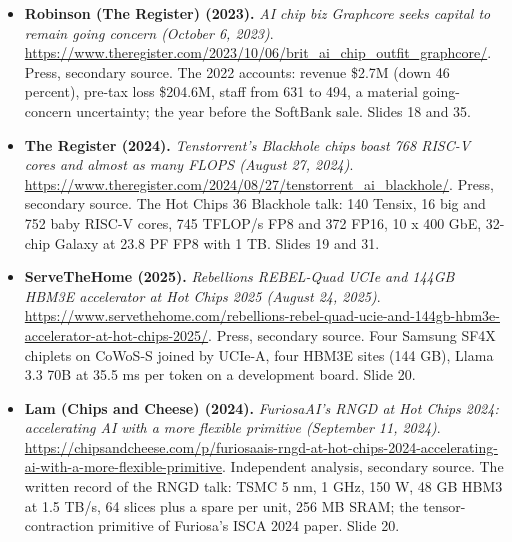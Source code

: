 \begin{itemize}[leftmargin=1.2em,itemsep=3pt]
\item \textbf{Robinson (The Register) (2023).} \textit{AI chip biz Graphcore seeks capital to remain going concern (October 6, 2023)}. \url{https://www.theregister.com/2023/10/06/brit_ai_chip_outfit_graphcore/}. Press, secondary source. The 2022 accounts: revenue \$2.7M (down 46 percent), pre-tax loss \$204.6M, staff from 631 to 494, a material going-concern uncertainty; the year before the SoftBank sale. Slides 18 and 35.
\item \textbf{The Register (2024).} \textit{Tenstorrent's Blackhole chips boast 768 RISC-V cores and almost as many FLOPS (August 27, 2024)}. \url{https://www.theregister.com/2024/08/27/tenstorrent_ai_blackhole/}. Press, secondary source. The Hot Chips 36 Blackhole talk: 140 Tensix, 16 big and 752 baby RISC-V cores, 745 TFLOP/s FP8 and 372 FP16, 10 x 400 GbE, 32-chip Galaxy at 23.8 PF FP8 with 1 TB. Slides 19 and 31.
\item \textbf{ServeTheHome (2025).} \textit{Rebellions REBEL-Quad UCIe and 144GB HBM3E accelerator at Hot Chips 2025 (August 24, 2025)}. \url{https://www.servethehome.com/rebellions-rebel-quad-ucie-and-144gb-hbm3e-accelerator-at-hot-chips-2025/}. Press, secondary source. Four Samsung SF4X chiplets on CoWoS-S joined by UCIe-A, four HBM3E sites (144 GB), Llama 3.3 70B at 35.5 ms per token on a development board. Slide 20.
\item \textbf{Lam (Chips and Cheese) (2024).} \textit{FuriosaAI's RNGD at Hot Chips 2024: accelerating AI with a more flexible primitive (September 11, 2024)}. \url{https://chipsandcheese.com/p/furiosaais-rngd-at-hot-chips-2024-accelerating-ai-with-a-more-flexible-primitive}. Independent analysis, secondary source. The written record of the RNGD talk: TSMC 5 nm, 1 GHz, 150 W, 48 GB HBM3 at 1.5 TB/s, 64 slices plus a spare per unit, 256 MB SRAM; the tensor-contraction primitive of Furiosa's ISCA 2024 paper. Slide 20.
\end{itemize}
